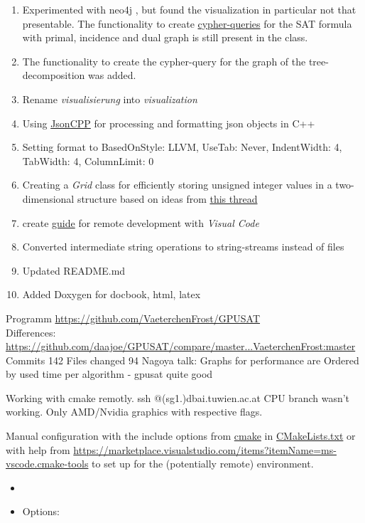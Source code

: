 \documentclass[a4paper, 12pt]{scrartcl}
\begin{document}
\begin{enumerate}
	\item Experimented with neo4j \cite{graphUseCases}, but found the visualization in particular not that presentable. The functionality to create \href{https://neo4j.com/developer/cypher-resources/}{cypher-queries} for the SAT formula with primal, incidence and dual graph is still present in the class.
	\item The functionality to create the cypher-query for the graph of the tree-decomposition was added.
	\item Rename \textit{visualisierung} into \textit{visualization}
	\item Using \href{https://github.com/open-source-parsers/jsoncpp}{JsonCPP} for processing and formatting json objects in C++
	\item Setting format to {BasedOnStyle: LLVM, UseTab: Never, IndentWidth: 4, TabWidth: 4, ColumnLimit: 0}
	\item Creating a \emph{Grid} class for efficiently storing unsigned integer values in a two-dimensional structure
	based on ideas from \href{https://stackoverflow.com/questions/936687}{this thread}
	\item create \href{https://github.com/VaeterchenFrost/GPUSAT/blob/master/VisualCodeUsage.md}{guide} for remote development with \emph{Visual Code}
	\item Converted intermediate string operations to string-streams instead of files
	\item Updated README.md
	\item Added Doxygen for docbook, html, latex	
\end{enumerate}
Programm \url{https://github.com/VaeterchenFrost/GPUSAT} \\
Differences: \url{https://github.com/daajoe/GPUSAT/compare/master...VaeterchenFrost:master}  Commits 142 Files changed 94 
Nagoya talk:
Graphs for performance are Ordered by used time per algorithm - gpusat quite good

Working with cmake remotly. ssh @(sg1.)dbai.tuwien.ac.at
CPU branch wasn't working.
Only AMD/Nvidia graphics  with respective flags.

Manual configuration with the include options from \href{https://cmake.org/}{cmake} in \href{https://github.com/VaeterchenFrost/GPUSAT/blob/master/CMakeLists.txt}{CMakeLists.txt}
or with help from \url{https://marketplace.visualstudio.com/items?itemName=ms-vscode.cmake-tools}
to set up for the (potentially remote) environment.

\begin{itemize}
	\item 
	\item Options:
\end{itemize}
\end{document}
